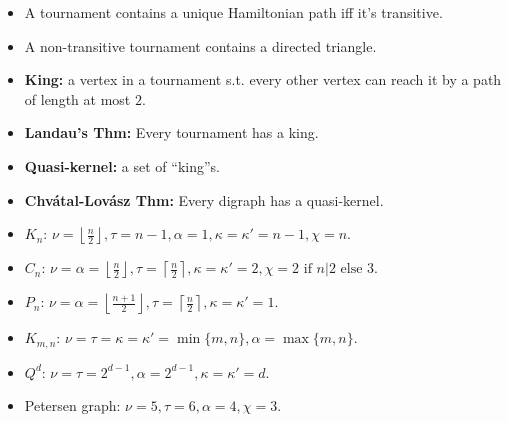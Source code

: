 \documentclass[10pt]{article}
\begin{document}
\begin{multicols*}{3}
\begin{itemize}
            \item A tournament contains a unique Hamiltonian path iff it's transitive.
            \item A non-transitive tournament contains a directed triangle.
            \item \textbf{King:} a vertex in a tournament s.t. every other vertex can reach it by a path of length at most $2$.
            \item \textbf{Landau's Thm:} Every tournament has a king.
            \item \textbf{Quasi-kernel:} a set of ``king''s.
            \item \textbf{Chv\'{a}tal-Lov\'{a}sz Thm:} Every digraph has a quasi-kernel.
            \item $K_n$: $\nu = \left\lfloor\frac{n}{2}\right\rfloor, \tau = n - 1, \alpha = 1, \kappa = \kappa' = n - 1, \chi = n$.
            \item $C_n$: $\nu = \alpha = \left\lfloor\frac{n}{2}\right\rfloor, \tau = \left\lceil\frac{n}{2}\right\rceil, \kappa = \kappa' = 2, \chi = 2 \textrm{ if } n | 2 \textrm{ else } 3$.
            \item $P_n$: $\nu = \alpha = \left\lfloor\frac{n + 1}{2}\right\rfloor, \tau = \left\lceil\frac{n}{2}\right\rceil, \kappa = \kappa' = 1$.
            \item $K_{m, n}$: $\nu = \tau = \kappa = \kappa' = \min\{m, n\}, \alpha = \max\{m, n\}$.
            \item $Q^d$: $\nu = \tau = 2^{d - 1}, \alpha = 2^{d - 1}, \kappa = \kappa' = d$.
            \item Petersen graph: $\nu = 5, \tau = 6, \alpha = 4, \chi = 3$.
        \end{itemize}
    \end{multicols*}
\end{document}
